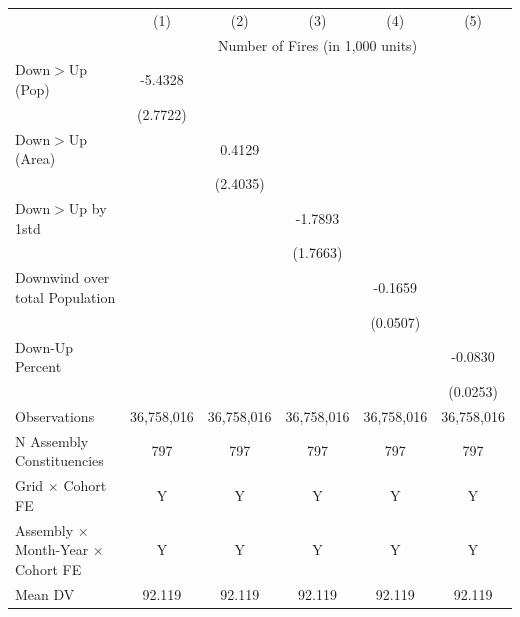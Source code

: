 \begin{tabular}{lccccc}
\hline
& (1) & (2) & (3) & (4) & (5)\\
& \multicolumn{5}{c}{Number of Fires (in 1,000 units) }\\
\hline

Down$>$Up (Pop)&     -5.4328\sym{*}  &                     &                     &                     &                     \\
            &    (2.7722)         &                     &                     &                     &                     \\
Down$>$Up (Area)&                     &      0.4129         &                     &                     &                     \\
            &                     &    (2.4035)         &                     &                     &                     \\
Down$>$Up by 1std&                     &                     &     -1.7893         &                     &                     \\
            &                     &                     &    (1.7663)         &                     &                     \\
Downwind over total Population&                     &                     &                     &     -0.1659\sym{***}&                     \\
            &                     &                     &                     &    (0.0507)         &                     \\
Down-Up Percent&                     &                     &                     &                     &     -0.0830\sym{***}\\
            &                     &                     &                     &                     &    (0.0253)         \\
\hline
Observations&  36,758,016         &  36,758,016         &  36,758,016         &  36,758,016         &  36,758,016         \\
N Assembly Constituencies&         797         &         797         &         797         &         797         &         797         \\
Grid $\times$ Cohort FE&           Y         &           Y         &           Y         &           Y         &           Y         \\
Assembly $\times$ Month-Year $\times$ Cohort FE&           Y         &           Y         &           Y         &           Y         &           Y         \\
Mean DV     &      92.119         &      92.119         &      92.119         &      92.119         &      92.119         \\
\hline
\end{tabular}
